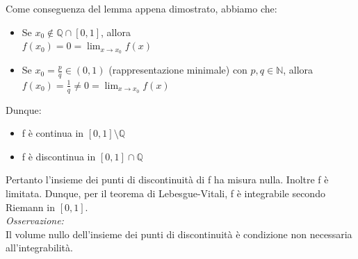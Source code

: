 \documentclass[10pt]{article}
\theoremstyle{plain}
\theoremstyle{definition}
\begin{document}
Come conseguenza del lemma appena dimostrato, abbiamo che:
\begin{itemize}
    \item Se $x_0 \notin \mathbb{Q} \cap [0,1]$, allora\\
    $f(x_0)=0=\lim_{x \to x_0} f(x)$
    \item Se $x_0 = \frac{p}{q} \in (0,1)$ (rappresentazione minimale) con $p,q \in \mathbb{N}$, allora
    $f(x_0)=\frac{1}{q} \ne 0 = \lim_{x \to x_0} f(x)$
\end{itemize}
Dunque:
\begin{itemize}
    \item f è continua in $[0,1] \setminus \mathbb{Q}$
    \item f è discontinua in $[0,1] \cap \mathbb{Q}$
\end{itemize}
Pertanto l'insieme dei punti di discontinuità di f ha misura nulla. Inoltre f è limitata. Dunque, per il teorema di Lebesgue-Vitali, f è integrabile secondo Riemann in $[0,1]$.
\\
\textit{Osservazione:}\\ Il volume nullo dell'insieme dei punti di discontinuità è condizione non necessaria all'integrabilità.
\end{document}
